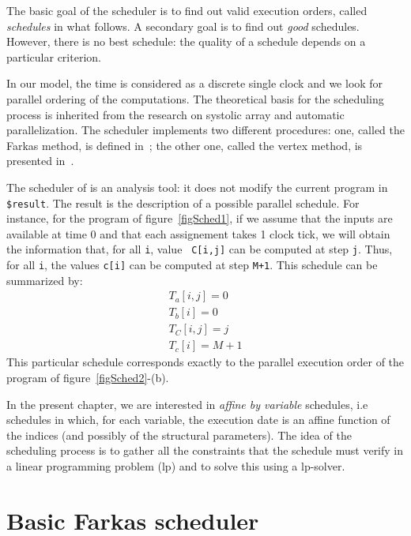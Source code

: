 The basic goal of the scheduler is to find out valid execution orders, 
called {\em schedules} in what follows. 
A secondary goal is to find out {\em good} schedules. 
However, there is no best schedule: the quality of
a schedule depends on a particular criterion. 

In our model, the time is considered as a discrete single clock and we
look for parallel ordering of the computations.  The theoretical basis
for the scheduling process is inherited from the research on systolic
array and automatic parallelization. The scheduler implements two
different procedures: one, called the Farkas method, is defined
in~\cite{Feautrier92aa}; the other one, called the vertex method, is
presented in~\cite{citationdespaa}.

The scheduler of \alfa{} is an analysis tool: it does not modify the
current program in \texttt{\$result}.  The result is the description of a
possible parallel schedule. For instance, for the program of
figure~\ref{figSched1}, if we assume that the inputs are available at
time 0 and that each assignement takes 1 clock tick, we
will obtain the information that, for all \texttt{i}, value {\tt
C[i,j]} can be computed at step \texttt{j}.  Thus, for all \texttt{i}, the
values \texttt{c[i]} can be computed at step \texttt{M+1}. This schedule
can be summarized by:
\begin{equation}
\label{Schedeqn1}
\begin{array}{l} T_a[i,j] = 0 \\ T_b[i] = 0 \\ 
T_C[i,j] = j \\ T_c[i] = M+1 \end{array} 
\end{equation}
This particular schedule corresponds exactly
to the parallel execution order of the program of figure~\ref{figSched2}-(b).

In the present chapter, we are interested in {\em affine by variable}
schedules, i.e schedules in which, for each variable, the execution
date is an affine function of the indices (and possibly of the
structural parameters). The idea of the scheduling process is to
gather all the constraints that the schedule must verify in a linear
programming problem ({\sc lp}) and to solve this \lp{} using a {\sc lp}-solver.

\section{Basic Farkas scheduler}

